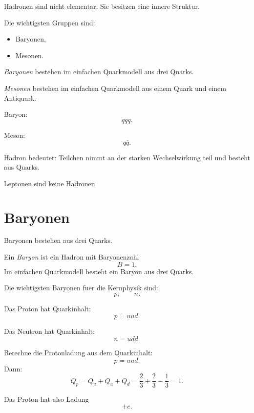 \begin{conceptbox}
Hadronen sind nicht elementar.
Sie besitzen eine innere Struktur.

Die wichtigsten Gruppen sind:
\begin{itemize}
    \item Baryonen,
    \item Mesonen.
\end{itemize}
\end{conceptbox}

\begin{definitionbox}
\emph{Baryonen} bestehen im einfachen Quarkmodell aus drei Quarks.

\emph{Mesonen} bestehen im einfachen Quarkmodell aus einem Quark und einem Antiquark.
\end{definitionbox}

\begin{formulabox}
Baryon:
\[
    qqq.
\]

Meson:
\[
    q\overline{q}.
\]
\end{formulabox}

\begin{examtipbox}
Hadron bedeutet:
Teilchen nimmt an der starken Wechselwirkung teil und besteht aus Quarks.

Leptonen sind keine Hadronen.
\end{examtipbox}

\section{Baryonen}

Baryonen bestehen aus drei Quarks.

\begin{definitionbox}
Ein \emph{Baryon} ist ein Hadron mit Baryonenzahl
\[
    B=1.
\]
Im einfachen Quarkmodell besteht ein Baryon aus drei Quarks.
\end{definitionbox}

\begin{conceptbox}
Die wichtigsten Baryonen fuer die Kernphysik sind:
\[
    p,
    \qquad
    n.
\]

Das Proton hat Quarkinhalt:
\[
    p=uud.
\]

Das Neutron hat Quarkinhalt:
\[
    n=udd.
\]
\end{conceptbox}

\begin{examplebox}
Berechne die Protonladung aus dem Quarkinhalt:
\[
    p=uud.
\]
Dann:
\[
    Q_p
    =
    Q_u+Q_u+Q_d
    =
    \frac{2}{3}
    +
    \frac{2}{3}
    -
    \frac{1}{3}
    =
    1.
\]

Das Proton hat also Ladung
\[
    +e.
\]
\end{examplebox}

